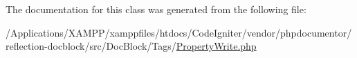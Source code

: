 The documentation for this class was generated from the following file\+:\begin{DoxyCompactItemize}
\item 
/\+Applications/\+X\+A\+M\+P\+P/xamppfiles/htdocs/\+Code\+Igniter/vendor/phpdocumentor/reflection-\/docblock/src/\+Doc\+Block/\+Tags/\mbox{\hyperlink{_property_write_8php}{Property\+Write.\+php}}\end{DoxyCompactItemize}
